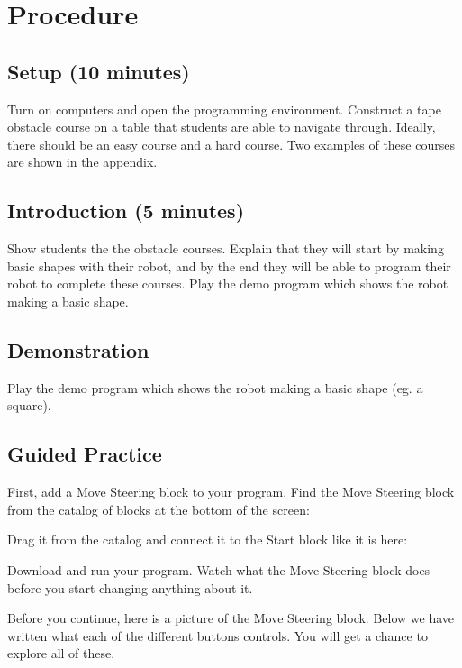 \documentclass{lessonplan}
\begin{document}
      
      
  \section{Procedure}
  
    \subsection{Setup (10 minutes)}
      Turn on computers and open the programming environment. Construct a tape obstacle course on a table that students are able to navigate through. Ideally, there should be an easy course and a hard course. Two examples of these courses are shown in the appendix. 
      
    \subsection{Introduction (5 minutes)}
        Show students the the obstacle courses. Explain that they will start by making basic shapes with their robot, and by the end they will be able to program their robot to complete these courses. Play the demo program which shows the robot making a basic shape.

    \subsection{Demonstration}
      Play the demo program which shows the robot making a basic shape (eg. a square).
    \subsection{Guided Practice}
    First, add a Move Steering block to your program.
    Find the Move Steering block from the catalog of blocks at the bottom of the screen:
    

    Drag it from the catalog and connect it to the Start block like it is here:
    


    Download and run your program. Watch what the Move Steering block does before you start changing anything about it.
    \par
    Before you continue, here is a picture of the Move Steering block. Below we have written what each of the different buttons controls. You will get a chance to explore all of these.
\end{document}
